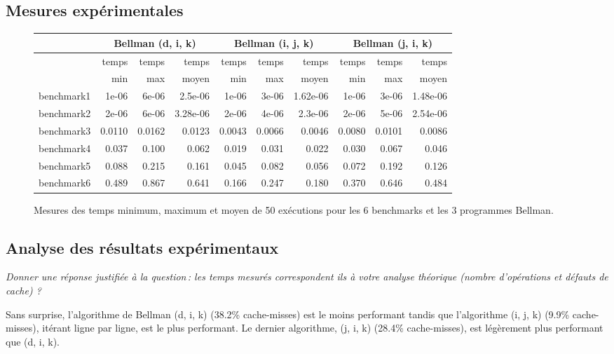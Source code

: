 \documentclass[a4paper, 10pt, french]{article}
\begin{document}
\subsection{Mesures expérimentales}

\begin{figure}[h]
  \begin{center}
    \begin{tabular}{|l||r|r|r|r|r|r|r|r|r||}
      \hline
      \hline
      & \multicolumn{3}{c|}{Bellman (d, i, k)} & \multicolumn{3}{c|}{Bellman (i, j, k)} & \multicolumn{3}{c|}{Bellman (j, i, k)}\\
      \hline
                 & temps & temps & temps & temps & temps & temps & temps & temps & temps \\
                 & min   & max   & moyen & min   & max   & moyen & min   & max   & moyen \\
      \hline
      \hline
      benchmark1 & 1e-06 & 6e-06 & 2.5e-06 & 1e-06 & 3e-06 & 1.62e-06 & 1e-06 & 3e-06 & 1.48e-06 \\
      \hline
      benchmark2 & 2e-06 & 6e-06 & 3.28e-06 & 2e-06 & 4e-06 & 2.3e-06 & 2e-06 & 5e-06 & 2.54e-06 \\
      \hline
      benchmark3 & 0.0110 & 0.0162 & 0.0123 & 0.0043 & 0.0066 & 0.0046 & 0.0080 & 0.0101 & 0.0086 \\
      \hline
      benchmark4 & 0.037 & 0.100 & 0.062 & 0.019 & 0.031 & 0.022 & 0.030 & 0.067 & 0.046 \\
      \hline
      benchmark5 & 0.088 & 0.215 & 0.161 & 0.045 & 0.082 & 0.056 & 0.072 & 0.192 & 0.126 \\
      \hline
      benchmark6 & 0.489 & 0.867 & 0.641 & 0.166 & 0.247 & 0.180 & 0.370 & 0.646 & 0.484 \\
      \hline
      \hline
    \end{tabular}
    \caption{Mesures des temps minimum, maximum et moyen de 50 exécutions pour les 6 benchmarks et les 3 programmes Bellman.}
    \label{table-temps}
  \end{center}
\end{figure}

\subsection{Analyse des résultats expérimentaux}
{\em Donner  une réponse justifiée  à la question\,:
  les  temps mesurés correspondent ils  à votre analyse théorique (nombre d’opérations et défauts de cache) ?
}

Sans surprise, l'algorithme de Bellman (d, i, k) (38.2\% cache-misses) est le moins performant tandis que l'algorithme (i, j, k) (9.9\% cache-misses), itérant ligne par ligne, est le plus performant. Le dernier algorithme, (j, i, k) (28.4\% cache-misses), est légèrement plus performant que (d, i, k).
\end{document}
